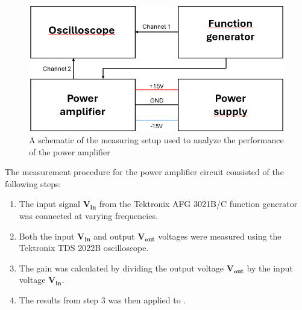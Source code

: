 \begin{figure}[H]
    \centering
    \includegraphics[width=0.8\linewidth]{TU Delft Booming Bass Project Report/figures/test setup.png}
    \caption{A schematic of the measuring setup used to analyze the performance of the power amplifier}
    \label{fig:PA test setup}
\end{figure}

The measurement procedure for the power amplifier circuit consisted of the following steps:
\begin{enumerate}
\item The input signal $\mathbf{V_{in}}$ from the Tektronix AFG 3021B/C function generator was connected at varying frequencies.
\item Both the input $\mathbf{V_{in}}$ and output $\mathbf{V_{out}}$ voltages were measured using the Tektronix TDS 2022B oscilloscope.
\item The gain was calculated by dividing the output voltage $\mathbf{V_{out}}$ by the input voltage $\mathbf{V_{in}}$.
\item The results from step 3 was then applied to .

\end{enumerate}
 


